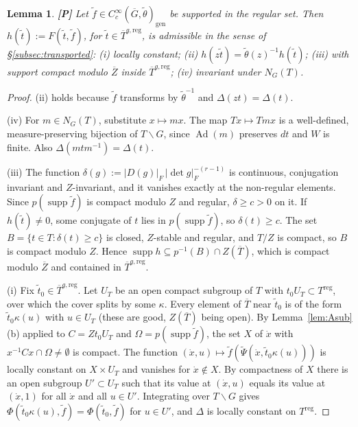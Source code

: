 \documentclass[12pt]{article}
\newcommand{\ov}[1]{\overline{#1}}
\newcommand{\gen}{\mathrm{gen}}
\newcommand{\reg}{\mathrm{reg}}
\newcommand{\Ad}{\operatorname{Ad}}
\newcommand{\supp}{\operatorname{supp}}
\newcommand{\Gb}{\ov{G}}
\newcommand{\Zb}{\ov{Z}}
\newcommand{\Tb}{\ov{T}}
\newcommand{\Pv}{\textbf{[P]}}
\theoremstyle{plain}
\newtheorem{lemma}[theorem]{Lemma}
\theoremstyle{definition}
\begin{document}
\begin{lemma}\label{lem:Aprops}\Pv
Let $\tilde f\in C_c^\infty(\Gb,\tilde\theta)_\gen$ be supported in the regular set. Then $h(\tilde t):=F(\tilde t,\tilde f)$, for $\tilde t\in\Tb^{g,\reg}$, is admissible in the sense of \S\ref{subsec:transported}: (i) locally constant; (ii) $h(z\tilde t)=\tilde\theta(z)^{-1}h(\tilde t)$; (iii) with support compact modulo $\Zb$ inside $\Tb^{g,\reg}$; (iv) invariant under $N_G(T)$.
\end{lemma}
\begin{proof}
(ii) holds because $\tilde f$ transforms by $\tilde\theta^{-1}$ and $\Delta(zt)=\Delta(t)$.

(iv) For $m\in N_G(T)$, substitute $x\mapsto mx$. The map $Tx\mapsto Tmx$ is a well-defined, measure-preserving bijection of $T\backslash G$, since $\Ad(m)$ preserves $dt$ and $W$ is finite. Also $\Delta(mtm^{-1})=\Delta(t)$.

(iii) The function $\delta(g):=|D(g)|_F\,|\det g|_F^{-(r-1)}$ is continuous, conjugation invariant and $Z$-invariant, and it vanishes exactly at the non-regular elements. Since $p(\supp\tilde f)$ is compact modulo $Z$ and regular, $\delta\ge c>0$ on it. If $h(\tilde t)\ne0$, some conjugate of $t$ lies in $p(\supp\tilde f)$, so $\delta(t)\ge c$. The set $B=\{t\in T:\delta(t)\ge c\}$ is closed, $Z$-stable and regular, and $T/Z$ is compact, so $B$ is compact modulo $Z$. Hence $\supp h\subseteq p^{-1}(B)\cap Z(\Tb)$, which is compact modulo $\Zb$ and contained in $\Tb^{g,\reg}$.

(i) Fix $\tilde t_0\in\Tb^{g,\reg}$. Let $U_T$ be an open compact subgroup of $T$ with $t_0U_T\subset T^{\reg}$, over which the cover splits by some $\kappa$. Every element of $\Tb$ near $\tilde t_0$ is of the form $\tilde t_0\kappa(u)$ with $u\in U_T$ (these are good, $Z(\Tb)$ being open). By Lemma~\ref{lem:Asub}(b) applied to $C=Zt_0U_T$ and $\Omega=p(\supp\tilde f)$, the set $X$ of $\dot x$ with $x^{-1}Cx\cap\Omega\ne\emptyset$ is compact. The function $(\dot x,u)\mapsto\tilde f(\tilde\Psi(\dot x,\tilde t_0\kappa(u)))$ is locally constant on $X\times U_T$ and vanishes for $\dot x\notin X$. By compactness of $X$ there is an open subgroup $U'\subset U_T$ such that its value at $(\dot x,u)$ equals its value at $(\dot x,1)$ for all $\dot x$ and all $u\in U'$. Integrating over $T\backslash G$ gives $\Phi(\tilde t_0\kappa(u),\tilde f)=\Phi(\tilde t_0,\tilde f)$ for $u\in U'$, and $\Delta$ is locally constant on $T^{\reg}$.
\end{proof}
\end{document}
